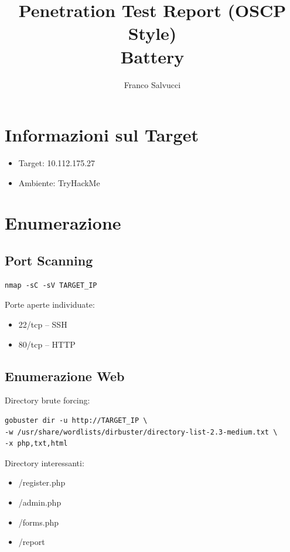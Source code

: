 \documentclass[a4paper,11pt]{article}
\title{\textbf{Penetration Test Report (OSCP Style)}\\Battery}
\author{Franco Salvucci}
\date{}
\begin{document}
\maketitle
\tableofcontents
\newpage

\section{Informazioni sul Target}

\begin{itemize}
    \item Target: 10.112.175.27
    \item Ambiente: TryHackMe
\end{itemize}

\section{Enumerazione}

\subsection{Port Scanning}

\begin{lstlisting}
nmap -sC -sV TARGET_IP
\end{lstlisting}

Porte aperte individuate:

\begin{itemize}
    \item 22/tcp – SSH
    \item 80/tcp – HTTP
\end{itemize}

\subsection{Enumerazione Web}

Directory brute forcing:

\begin{lstlisting}
gobuster dir -u http://TARGET_IP \
-w /usr/share/wordlists/dirbuster/directory-list-2.3-medium.txt \
-x php,txt,html
\end{lstlisting}

Directory interessanti:

\begin{itemize}
    \item /register.php
    \item /admin.php
    \item /forms.php
    \item /report
\end{itemize}
\end{document}
